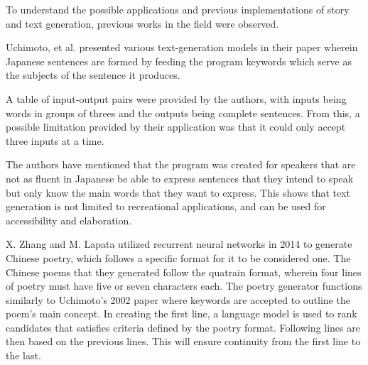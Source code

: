 \documentclass[journal]{./IEEE/IEEEtran}
\begin{document}






To understand the possible applications and previous implementations of story and text generation, previous works in the field were observed.

Uchimoto, et al. presented various text-generation models in their paper wherein Japanese sentences are formed by feeding the program keywords which serve as the subjects of the sentence it produces. \cite{UKIHSS2002} 

A table of input-output pairs were provided by the authors, with inputs being words in groups of threes and the outputs being complete sentences. From this, a possible limitation provided by their application was that it could only accept three inputs at a time.

\pubidadjcol
The authors have mentioned that the program was created for speakers that are not as fluent in Japanese be able to express sentences that they intend to speak but only know the main words that they want to express. This shows that text generation is not limited to recreational applications, and can be used for accessibility and elaboration. %

X. Zhang and M. Lapata utilized recurrent neural networks in 2014 to generate Chinese poetry, which follows a specific format for it to be considered one.
\cite{ZXLM2014}
The Chinese poems that they generated follow the quatrain format, wherein four lines of poetry must have five or seven characters each.
The poetry generator functions similarly to Uchimoto's 2002 paper where keywords are accepted to outline the poem's main concept.
In creating the first line, a language model is used to rank candidates that satisfies criteria defined by the poetry format. Following lines are then based on the previous lines. This will ensure continuity from the first line to the last.
\end{document}
